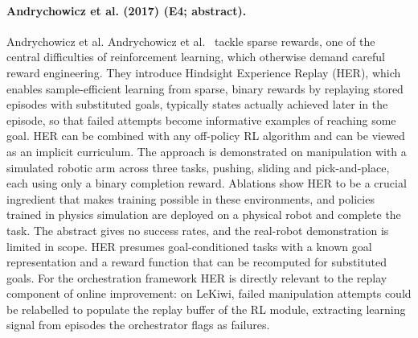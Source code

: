 \documentclass[10pt,a4paper]{article}
\begin{document}
\paragraph{Andrychowicz et al. (2017) (E4; abstract).} Andrychowicz et al. Andrychowicz et al.~\cite{Andrychowicz2017} tackle sparse rewards, one of the central difficulties of reinforcement learning, which otherwise demand careful reward engineering. They introduce Hindsight Experience Replay (HER), which enables sample-efficient learning from sparse, binary rewards by replaying stored episodes with substituted goals, typically states actually achieved later in the episode, so that failed attempts become informative examples of reaching some goal. HER can be combined with any off-policy RL algorithm and can be viewed as an implicit curriculum. The approach is demonstrated on manipulation with a simulated robotic arm across three tasks, pushing, sliding and pick-and-place, each using only a binary completion reward. Ablations show HER to be a crucial ingredient that makes training possible in these environments, and policies trained in physics simulation are deployed on a physical robot and complete the task. The abstract gives no success rates, and the real-robot demonstration is limited in scope. HER presumes goal-conditioned tasks with a known goal representation and a reward function that can be recomputed for substituted goals. For the orchestration framework HER is directly relevant to the replay component of online improvement: on LeKiwi, failed manipulation attempts could be relabelled to populate the replay buffer of the RL module, extracting learning signal from episodes the orchestrator flags as failures.
\end{document}
